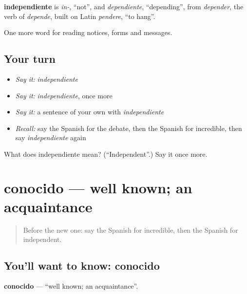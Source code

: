 \begin{cousinweb}
\textbf{independiente} is \emph{in-}, \textquotedblleft{}not\textquotedblright{}, and \emph{dependiente}, \textquotedblleft{}depending\textquotedblright{}, from \emph{depender}, the verb of \emph{depende}, built on Latin \emph{pendere}, \textquotedblleft{}to hang\textquotedblright{}.
\end{cousinweb}

\begin{grammarlens}[title={What you've built}]
One more word for reading notices, forms and messages.
\end{grammarlens}

\subsection*{Your turn}
\begin{itemize}
\raggedright
  \item \emph{Say it:} \emph{independiente}
  \item \emph{Say it:} \emph{independiente}, once more
  \item \emph{Say it:} a sentence of your own with \emph{independiente}
  \item \emph{Recall:} say the Spanish for the debate, then the Spanish for incredible, then say \emph{independiente} again
\end{itemize}

\begin{tcolorbox}[breakable,colback=teal!4,colframe=teal!35!black,title={Before you move on}]
What does independiente mean? (\textquotedblleft{}Independent\textquotedblright{}.) Say it once more.
\end{tcolorbox}
\section[conocido]{conocido — well known; an acquaintance}

\label{lesson:ES-C508-conocido}



\begin{quote}
Before the new one: say the Spanish for incredible, then the Spanish for independent.
\end{quote}

\subsection*{You'll want to know: conocido}
\textbf{conocido} — \textquotedblleft{}well known; an acquaintance\textquotedblright{}.

